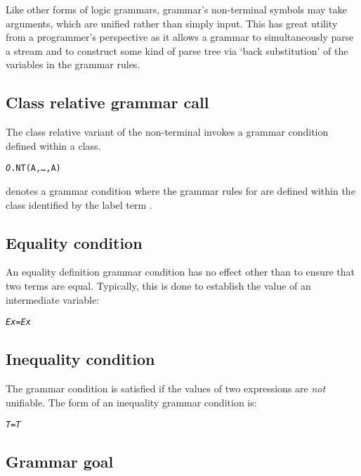 Like other forms of logic grammars, \go grammar's non-terminal symbols may take arguments, which are unified rather than simply input. This has great utility from a programmer's perspective as it allows a grammar to simultaneously parse a stream and to construct some kind of parse tree via `back substitution' of the variables in the grammar rules.

\subsection{Class relative grammar call}
\label{grammar:dot}
The class relative variant of the non-terminal invokes a grammar condition defined within a class.

\begin{alltt}
\emph{O}.NT(A,\ldots,A\subn)
\end{alltt}
denotes a grammar condition where the grammar rules for  are defined within the class identified by the label term .


\subsection{Equality condition}
\label{grammar:equality}

An equality definition grammar condition has no effect other than to ensure that two terms are equal. Typically, this is done to establish the value of an intermediate variable:
\begin{alltt}
\emph{Ex} = \emph{Ex}
\end{alltt}

\subsection{Inequality condition}
\label{grammar:notequality}

The \q{\bsl=} grammar condition is satisfied if the values of two expressions are \emph{not} unifiable. The form of an inequality grammar condition is:
\begin{alltt}
\emph{T} \bsl= \emph{T}
\end{alltt}


\subsection{Grammar goal}
\label{grammar:goal}

